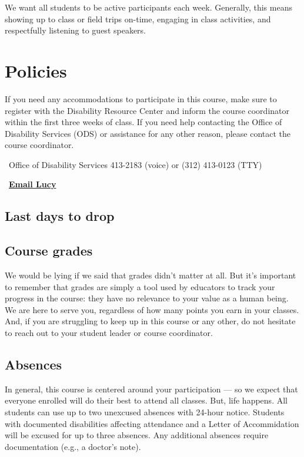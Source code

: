 \documentclass[12pt]{article}
\let\oldhref\href
\renewcommand{\href}[2]{\oldhref{#1}{\bfseries#2}}
\begin{document}
We want all students to be active participants each week. Generally, this means showing up to class or field trips on-time, engaging in class activities, and respectfully listening to guest speakers.

\section{Policies}

If you need any accommodations to participate in this course, make sure to register with the Disability Resource Center and inform the course coordinator within the first three weeks of class. If you need help contacting the Office of Disability Services (ODS) or assistance for any other reason, please contact the course coordinator.

\faPhone\ Office of Disability Services 413-2183 (voice) or (312) 413-0123 (TTY)

\faLaptop\ \href{mailto:ldelan5@uic.edu}{Email Lucy}

\subsection{Last days to drop}

\subsection{Course grades}

We would be lying if we said that grades didn’t matter at all. But it’s important to remember that grades are simply a tool used by educators to track your progress in the course: they have no relevance to your value as a human being. We are here to serve you, regardless of how many points you earn in your classes. And, if you are struggling to keep up in this course or any other, do not hesitate to reach out to your student leader or course coordinator.

\subsection{Absences}

In general, this course is centered around your participation — so we expect that everyone enrolled will do their best to attend all classes. But, life happens. All students can use up to two unexcused absences with 24-hour notice. Students with documented disabilities affecting attendance and a Letter of Accommidation will be excused for up to three absences. Any additional absences require documentation (e.g., a doctor's note).\\
\end{document}
